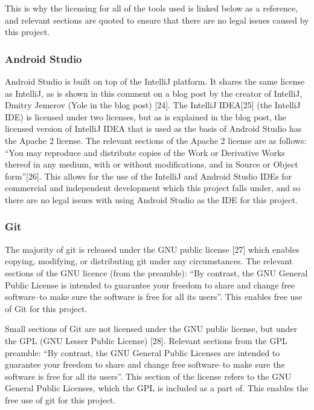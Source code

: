 \documentclass{article}
\begin{document}
This is why the licensing for all of the tools used is linked below as a reference, and relevant sections are quoted to ensure that there are no legal issues caused by this project. \par

\subsubsection{Android Studio}

Android Studio is built on top of the IntelliJ platform. It shares the same license as IntelliJ, as is shown in this comment on a blog post by the creator of IntelliJ, Dmitry Jemerov (Yole in the blog post) [24]. The IntelliJ IDEA[25] (the IntelliJ IDE) is licensed under two licenses, but as is explained in the blog post, the licensed version of IntelliJ IDEA that is used as the basis of Android Studio has the Apache 2 license. The relevant sections of the Apache 2 license are as follows: ``You may reproduce and distribute copies of the Work or Derivative Works thereof in any medium, with or without modifications, and in Source or Object form''[26]. This allows for the use of the IntelliJ and Android Studio IDEs for commercial and independent development which this project falls under, and so there are no legal issues with using Android Studio as the IDE for this project. \par

\subsubsection{Git}

The majority of git is released under the GNU public license [27] which enables copying, modifying, or distributing git under any circumstances. The relevant sections of the GNU licence (from the preamble): ``By contrast, the GNU General Public License is intended to guarantee your freedom to share and change free software--to make sure the software is free for all its users''. This enables free use of Git for this project. \par

Small sections of Git are not licensed under the GNU public license, but under the GPL (GNU Lesser Public License) [28]. Relevant sections from the GPL preamble: ``By contrast, the GNU General Public Licenses are intended to guarantee your freedom to share and change free software--to make sure the software is free for all its users''. This section of the license refers to the GNU General Public Licenses, which the GPL is included as a part of. This enables the free use of git for this project. \par
\end{document}

